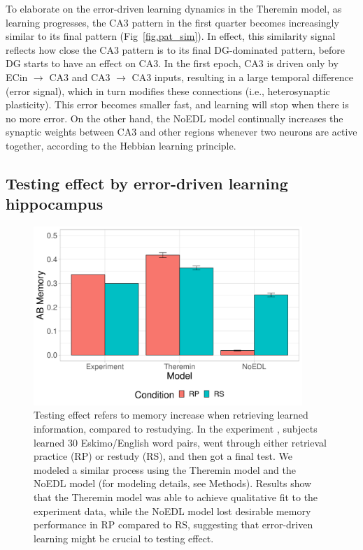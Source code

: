 \documentclass[11pt,twoside]{article}
\newif\myifpdf
\begin{document}
To elaborate on the error-driven learning dynamics in the Theremin model, as learning progresses, the CA3 pattern in the first quarter becomes increasingly similar to its final pattern (Fig~\ref{fig.pat_sim}). In effect, this similarity signal reflects how close the CA3 pattern is to its final DG-dominated pattern, before DG starts to have an effect on CA3. In the first epoch, CA3 is driven only by ECin $\rightarrow$ CA3 and CA3 $\rightarrow$ CA3 inputs, resulting in a large temporal difference (error signal), which in turn modifies these connections (i.e., heterosynaptic plasticity). This error becomes smaller fast, and learning will stop when there is no more error.  On the other hand, the NoEDL model continually increases the synaptic weights between CA3 and other regions whenever two neurons are active together, according to the Hebbian learning principle.

\subsection{Testing effect by error-driven learning hippocampus}

\begin{figure}
  \centering\includegraphics[width=4in]{fig_hip_edl_testingeffect}
  \caption{\footnotesize Testing effect refers to memory increase when retrieving learned information, compared to restudying.  In the experiment \citep{CarrierPashler92}, subjects learned 30 Eskimo/English word pairs, went through either retrieval practice (RP) or restudy (RS), and then got a final test.  We modeled a similar process using the Theremin model and the NoEDL model (for modeling details, see Methods).  Results show that the Theremin model was able to achieve qualitative fit to the experiment data, while the NoEDL model lost desirable memory performance in RP compared to RS, suggesting that error-driven learning might be crucial to testing effect.}
\label{fig.testingeffect}
\end{figure}
\end{document}
